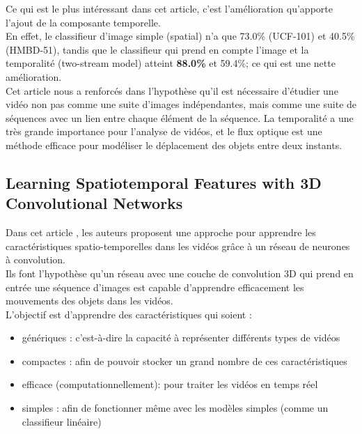 \documentclass[11pt]{article}
\begin{document}
Ce qui est le plus intéressant dans cet article, c'est l'amélioration qu'apporte l'ajout de la composante temporelle.\\
En effet, le classifieur d'image simple (spatial) n'a que 73.0\% (UCF-101) et 40.5\% (HMBD-51), tandis que le classifieur qui prend en compte l'image et la temporalité (two-stream model) atteint \textbf{88.0\%} et 59.4\%; ce qui est une nette amélioration.\\

Cet article nous a renforcés dans l'hypothèse qu'il est nécessaire d'étudier une vidéo non pas comme une suite d'images indépendantes, mais comme une suite de séquences avec un lien entre chaque élément de la séquence. La temporalité a une très grande importance pour l'analyse de vidéos, et le flux optique est une méthode efficace pour modéliser le déplacement des objets entre deux instants.\\

\subsection{Learning Spatiotemporal Features with 3D Convolutional Networks}
\label{sec:orgaeba9bd}
Dans cet article \cite{Tran_2015}, les auteurs proposent une approche pour apprendre les caractéristiques spatio-temporelles dans les vidéos grâce à un réseau de neurones à convolution.\\

Ils font l'hypothèse qu'un réseau avec une couche de convolution 3D qui prend en entrée une séquence d'images est capable d'apprendre efficacement les mouvements des objets dans les vidéos.\\

L'objectif est d'apprendre des caractéristiques qui soient :\\
\begin{itemize}
\item génériques : c'est-à-dire la capacité à représenter différents types de vidéos\\
\item compactes : afin de pouvoir stocker un grand nombre de ces caractéristiques\\
\item efficace (computationnellement): pour traiter les vidéos en temps réel\\
\item simples : afin de fonctionner même avec les modèles simples (comme un classifieur linéaire)\\
\end{itemize}
\end{document}
